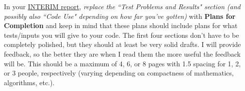 \documentclass[12pt]{article}
\begin{document}
\vspace*{2em}
In your \underline{INTERIM report}, \textit{replace the ``Test Problems and Results" section (and possibly also ``Code Use" depending on how far you've gotten)} with \textbf{Plans for Completion} and keep in mind that these plans should include plans for what tests/inputs you will give to your code. The first four sections don't have to be completely polished, but they should at least be very solid drafts. I will provide feedback, so the better they are when I read them the more useful the feedback will be. This should be a maximum of 4, 6, or 8 pages with 1.5 spacing for 1, 2, or 3 people, respectively (varying depending on compactness of mathematics, algorithms, etc.).


\vspace*{2em}

\end{document}
